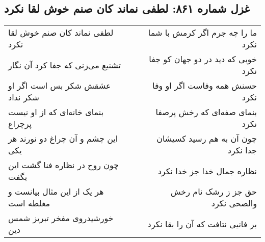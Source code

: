 \begin{center}
\section*{غزل شماره ۸۶۱: لطفی نماند کان صنم خوش لقا نکرد}
\label{sec:0861}
\begin{longtable}{l p{0.5cm} r}
لطفی نماند کان صنم خوش لقا نکرد
&&
ما را چه جرم اگر کرمش با شما نکرد
\\
تشنیع می‌زنی که جفا کرد آن نگار
&&
خوبی که دید در دو جهان کو جفا نکرد
\\
عشقش شکر بس است اگر او شکر نداد
&&
حسنش همه وفاست اگر او وفا نکرد
\\
بنمای خانه‌ای که از او نیست پرچراغ
&&
بنمای صفه‌ای که رخش پرصفا نکرد
\\
این چشم و آن چراغ دو نورند هر یکی
&&
چون آن به هم رسید کسیشان جدا نکرد
\\
چون روح در نظاره فنا گشت این بگفت
&&
نظاره جمال خدا جز خدا نکرد
\\
هر یک از این مثال بیانست و مغلطه است
&&
حق جز ز رشک نام رخش والضحی نکرد
\\
خورشیدروی مفخر تبریز شمس دین
&&
بر فانیی نتافت که آن را بقا نکرد
\\
\end{longtable}
\end{center}

